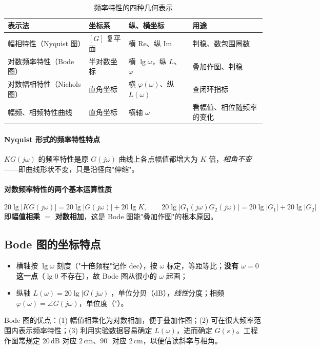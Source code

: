 \begin{table}[htbp]
\centering
\small
\setlength{\tabcolsep}{6pt}
\caption{频率特性的四种几何表示}\label{tab:freqgeom}
\begin{tabular}{p{3.8cm}p{2.2cm}p{4.0cm}p{3.0cm}}
\toprule
表示法 & 坐标系 & 纵、横坐标 & 用途 \\
\midrule
幅相特性（Nyquist 图） & $[G]$ 复平面 & 横 $\mathrm{Re}$、纵 $\mathrm{Im}$ & 判稳、数包围圈数 \\
对数频率特性（Bode 图） & 半对数坐标 & 横 $\lg\omega$，纵 $L$、$\varphi$ & 叠加作图、判稳 \\
对数幅相特性（Nichols 图） & 直角坐标 & 横 $\varphi(\omega)$、纵 $L(\omega)$ & 查闭环指标 \\
幅频、相频特性曲线 & 直角坐标 & 横轴 $\omega$ & 看幅值、相位随频率的变化 \\
\bottomrule
\end{tabular}
\end{table}

\paragraph{Nyquist 形式的频率特性特点}
$KG(j\omega)$ 的频率特性是原 $G(j\omega)$ 曲线上各点幅值都增大为 $K$ 倍，\emph{相角不变}——即曲线形状不变，只是沿径向"伸缩"。

\paragraph{对数频率特性的两个基本运算性质}
\[
20\lg|KG(j\omega)|=20\lg|G(j\omega)|+20\lg K,\qquad
20\lg|G_1(j\omega)G_2(j\omega)|=20\lg|G_1|+20\lg|G_2|
\]
即\textbf{幅值相乘 $=$ 对数相加}，这是 Bode 图能"叠加作图"的根本原因。

\subsection{Bode 图的坐标特点}
\begin{itemize}
    \item 横轴按 $\lg\omega$ 刻度（"十倍频程"记作 dec），按 $\omega$ 标定，等距等比；\textbf{没有 $\omega=0$ 这一点}（$\lg 0$ 不存在），故 Bode 图从很小的 $\omega$ 起画；
    \item 纵轴 $L(\omega)=20\lg|G(j\omega)|$，单位分贝（dB），\emph{线性}分度；相频 $\varphi(\omega)=\angle G(j\omega)$，单位度（$^\circ$）。
\end{itemize}
Bode 图的优点：(1) 幅值相乘化为对数相加，便于叠加作图；(2) 可在很大频率范围内表示频率特性；(3) 利用实验数据容易确定 $L(\omega)$，进而确定 $G(s)$。工程作图常规定 $20\,\mathrm{dB}$ 对应 $2\,\mathrm{cm}$、$90^\circ$ 对应 $2\,\mathrm{cm}$，以便估读斜率与相角。

